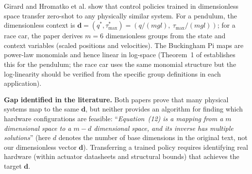 \documentclass[review,onefignum,onetabnum]{./SIAM_template/siamart171218}
\begin{document}
Girard \cite{Girard2024} and Hromatko et al. \cite{Hromatko2025} show that control
policies trained in dimensionless space transfer zero-shot to any physically similar
system.  For a pendulum, the dimensionless context is $\mathbf{d} = (q^*, \tau^*_{\max})
	= (q/(mgl),\ \tau_{\max}/(mgl))$; for a race car, the paper derives $m=6$ dimensionless
groups from the state and context variables (scaled positions and velocities).
The Buckingham Pi maps are power-law monomials and hence linear in log-space
(Theorem~1 of \cite{Girard2024} establishes this for the pendulum; the race car
uses the same monomial structure but the log-linearity should be verified from the
specific group definitions in each application).

\textbf{Gap identified in the literature.}
Both papers prove that many physical systems map to the same $\mathbf{d}$, but neither
provides an algorithm for finding which hardware configurations are feasible:
``\emph{Equation~(12) is a mapping from a $m$ dimensional space to a $m{-}d$
	dimensional space, and its inverse has multiple solutions}'' \cite{Girard2024}
(here $d$ denotes the number of base dimensions in the original text, not our
dimensionless vector $\mathbf{d}$).
Transferring a trained policy requires identifying real hardware (within actuator
datasheets and structural bounds) that achieves the target $\mathbf{d}$.
\end{document}
